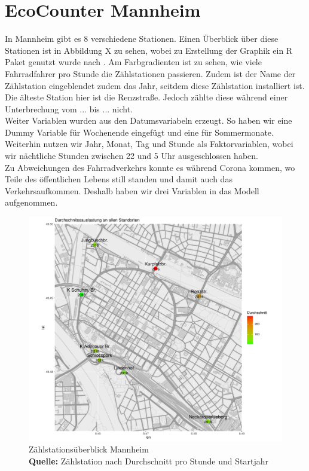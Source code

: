 \documentclass[a4paper,12pt]{thesis}
\newcommand*{\captionsource}[2]{%
	\caption[{#1}]{%
		#1%
		\\\hspace{\linewidth}%
		\textbf{Quelle:} #2%
	}%
}
\begin{document}
\section{EcoCounter Mannheim}

In Mannheim gibt es 8 verschiedene Stationen. Einen Überblick über diese Stationen ist in Abbildung X zu sehen, wobei zu Erstellung der Graphik ein R Paket genutzt wurde nach \cite{Kahle2013}. Am Farbgradienten ist zu sehen, wie viele Fahrradfahrer pro Stunde die Zählstationen passieren. Zudem ist der Name der Zählstation eingeblendet zudem das Jahr, seitdem diese Zählstation installiert ist. Die älteste Station hier ist die Renzstraße. Jedoch zählte diese während einer Unterbrechung vom ... bis ... nicht.\\
Weiter Variablen wurden aus den Datumsvariabeln erzeugt. So haben wir eine Dummy Variable für Wochenende eingefügt und eine für Sommermonate. Weiterhin nutzen wir Jahr, Monat, Tag und Stunde als Faktorvariablen, wobei wir nächtliche Stunden zwischen 22 und 5 Uhr ausgeschlossen haben.\\
Zu Abweichungen des Fahrradverkehrs konnte es während Corona kommen, wo Teile des öffentlichen Lebens still standen und damit auch das Verkehrsaufkommen. Deshalb haben wir drei Variablen in das Modell aufgenommen.

\begin{figure}[!ht]
	\centering
	\includegraphics[width=\textwidth]{Plots/Karte_Durchschnittsauslastung.pdf}
	\captionsource{Zählstationsüberblick Mannheim}{
		Zählstation nach Durchschnitt pro Stunde und Startjahr
	}
	\label{Figure1}
\end{figure}
\end{document}

